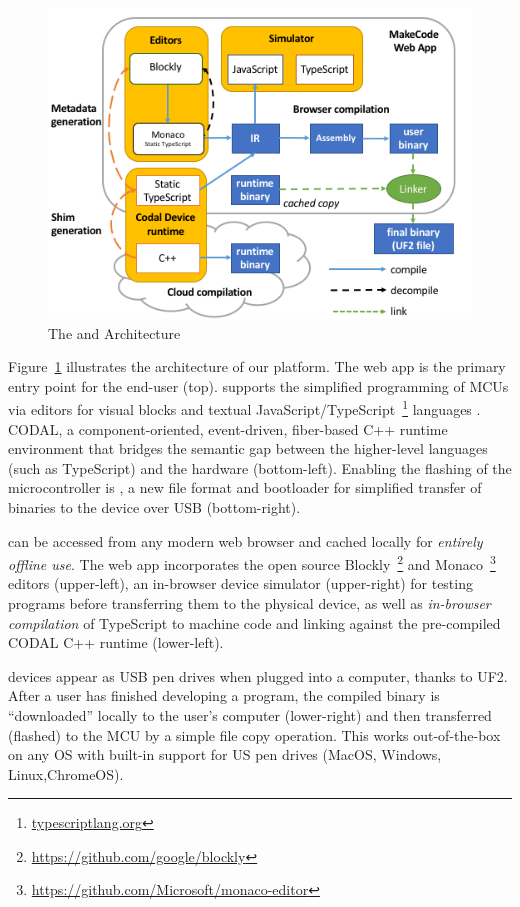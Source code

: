 \begin{figure}[t]
    \includegraphics[width=\columnwidth]{images/arch-diagram.png}
    \setlength{\belowcaptionskip}{-10pt}
    \caption{\label{fig:makecode}The \MC and \CO Architecture}
\end{figure}

Figure~\ref{fig:makecode} illustrates the architecture of our platform.
The \MC web app is the primary entry point for the end-user (top). \MC supports
the simplified programming of MCUs via editors for visual blocks and textual JavaScript/TypeScript~\footnote{\url{typescriptlang.org}} languages .
CODAL, a component-oriented, event-driven, fiber-based C++ runtime environment that bridges the semantic gap between the higher-level languages (such
as TypeScript) and the hardware (bottom-left). Enabling the flashing of the microcontroller is \UFN,
a new file format and bootloader for simplified transfer of binaries to the device over USB (bottom-right).

\MC can be accessed from any modern web browser and cached locally for \emph{entirely offline use}. The \MC web app incorporates the open source Blockly~\footnote{\url{https://github.com/google/blockly}} and Monaco~\footnote{\url{https://github.com/Microsoft/monaco-editor}} editors (upper-left), an in-browser device simulator (upper-right) for testing programs before transferring them to the physical device, as well as \emph{in-browser compilation} of TypeScript to machine code and linking against the pre-compiled
CODAL C++ runtime (lower-left).

\MC devices appear as USB pen drives when plugged into a computer, thanks to UF2. After a user has finished developing a program, the compiled binary is ``downloaded'' locally to the user's computer (lower-right) and then transferred (flashed) to the MCU by a simple file copy operation. This works out-of-the-box on any OS with built-in support for US pen drives (MacOS, Windows, Linux,ChromeOS).

